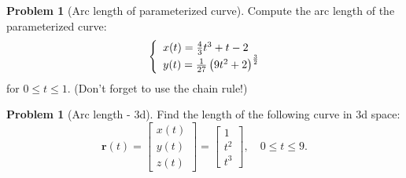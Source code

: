 \documentclass[10pt]{article}
\theoremstyle{definition}
\newtheorem{problem}[theorem]{Problem}
\newcommand{\1}[1]{\textbf{1}_{\left[#1\right]}} %
\begin{document}
\begin{problem}[Arc length of parameterized curve]
  Compute the arc length of the parameterized curve:
  \begin{equation*}
    \left\{ \begin{array}{l@{}l} x(t) = \frac{4}{3}t^{3}+t-2 \\ y(t) = \frac{1}{27}\left( 9t^{2}+2 \right)^{\frac{3}{2}} 
      \end{array}\right.
  \end{equation*}
  for $0 \leq t \leq 1$. (Don't forget to use the chain rule!)
\end{problem}


\begin{problem}[Arc length - 3d]
  Find the length of the following curve in 3d space:
  \begin{equation*}
    \mathbf{r}(t)=
    \begin{bmatrix}
      x(t)\\y(t)\\z(t)
    \end{bmatrix}
    =
    \begin{bmatrix}
      1\\t^{2}\\t^{3}
    \end{bmatrix}
    , \quad 0 \leq t \leq 9.
  \end{equation*}
\end{problem}
\end{document}
